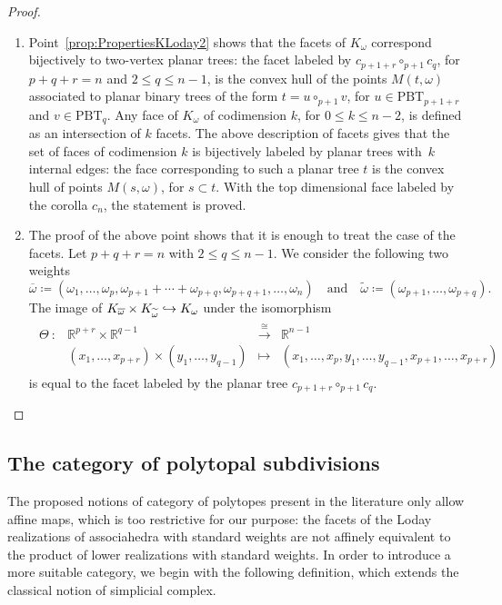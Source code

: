 \documentclass[10pt,a4paper]{amsart}
\numberwithin{equation}{section}\providecommand{\No}{}
\def\hto{\mathrel{\lhook\joinrel\to}}
\theoremstyle{plain}
\theoremstyle{definition}
\newcommand{\RR}{\mathbb{R}}
\newcommand{\K}{{K}}
\newcommand{\Tam}[1]{\mathrm{PBT}_{#1}}
\begin{document}
\begin{proof}
\begin{enumerate}
\item Point~\eqref{prop:PropertiesKLoday2} shows that the facets of $\K_\omega$ correspond bijectively to two-vertex planar trees: the facet labeled by
$c_{p+1+r}\circ_{p+1} c_q$, for $p+q+r=n$ and $2\leq q \leq n-1$, is the convex hull of the points $M(t, \omega)$ associated to planar binary trees of the form $t=u\circ_{p+1} v$, for $u\in\Tam{p+1+r}$ and $v\in \Tam{q}$.
Any face of $\K_\omega$ of codimension $k$, for
$0\leq k \leq n-2$, is defined as an intersection of $k$ facets. The above description of facets gives that the set of faces of codimension $k$ is bijectively labeled by planar trees with~$k$ internal edges: the face corresponding to such a planar tree $t$ is the convex hull of points $M(s, \omega)$, for $s\subset t$. With the top dimensional face labeled by the corolla $c_n$, the statement is proved.

\item The proof of the above point shows that it is enough to treat the case of the facets.
Let $p+q+r=n$ with $2\leq q \leq n-1$. We consider the following two weights
\[
\overline{\omega}\coloneqq (\omega_1, \ldots, \omega_{p}, \omega_{p+1}+\cdots+\omega_{p+q}, \omega_{p+q+1}, \ldots, \omega_{n})
\quad \text{and} \quad
\widetilde{\omega}\coloneqq (\omega_{p+1}, \ldots, \omega_{p+q}).
\]
The image of $\K_{\overline{\omega}}\times \K_{\widetilde{\omega}}\hto \K_\omega$ under the isomorphism
\begin{align*}
\begin{array}{rccc}
\Theta\ : & \RR^{p+r}\times \RR^{q-1} &\xrightarrow{~\cong~} &\RR^{n-1}\\
&(x_1, \ldots, x_{p+r})\times (y_1, \ldots, y_{q-1}) & \longmapsto&
(x_1, \ldots, x_{p}, y_1, \ldots, y_{q-1}, x_{p+1}, \ldots, x_{p+r})
\end{array}
\end{align*}
is equal to the facet labeled by the planar tree $c_{p+1+r}\circ_{p+1} c_q$.\qedhere
\end{enumerate}
\end{proof}

\subsection{The category of polytopal subdivisions}
The proposed notions of category of polytopes present in the literature only allow affine maps, which is too restrictive for our purpose: the facets of the Loday realizations of associahedra with standard weights are not affinely equivalent to the product of lower realizations with standard weights. In order to introduce a more suitable category, we begin with the following definition, which extends the classical notion of simplicial complex.
\end{document}
